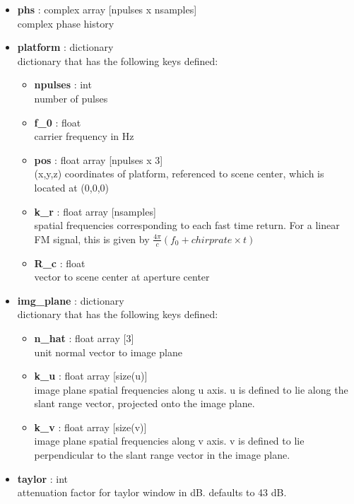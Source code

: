 \documentclass{article}
\newcommand{\defs}[2]{\textbf{{#1}} : {#2}}
\begin{document}
\begin{itemize}
	\item \defs{phs}{complex array [npulses x nsamples]}\\
  	complex phase history
  	\item \defs{platform}{dictionary}\\
  	dictionary that has the following keys defined:
	\begin{itemize}
	    \item \defs{npulses}{int}\\
	    	number of pulses
	    \item \defs{f\_0}{float}\\
	    	carrier frequency in Hz
	    \item \defs{pos}{float array [npulses x 3]}\\
	       	(x,y,z) coordinates of platform, referenced to scene center, which is located at (0,0,0)
	    \item\defs{k\_r}{float array [nsamples]}\\
	    	spatial frequencies corresponding to each fast time return.  For a linear FM signal, this is given by $\frac{4\pi}{c}(f_0+chirprate\times t)$
	    \item\defs{R\_c}{float}\\
	    	vector to scene center at aperture center
	\end{itemize}
  	\item \defs{img\_plane}{dictionary}\\
  	dictionary that has the following keys defined:
	\begin{itemize}
	    \item \defs{n\_hat}{float array [3]}\\
	    	unit normal vector to image plane
	    \item \defs{k\_u}{float array [size(u)]}\\
	    	image plane spatial frequencies along u axis.  u is defined to lie along the slant range vector, projected onto the image plane.
	    \item \defs{k\_v}{float array [size(v)]}\\
	    	image plane spatial frequencies along v axis.  v is defined to lie perpendicular to the slant range vector in the image plane.
	\end{itemize}
	\item\defs{taylor}{int}\\
	attenuation factor for taylor window in dB.  defaults to 43 dB.
\end{itemize}
\end{document}
